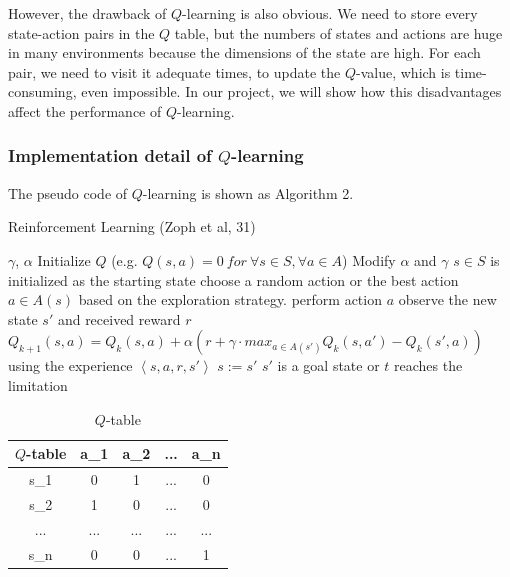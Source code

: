 \documentclass[14pt]{extarticle}
\begin{document}
However, the drawback of $Q$-learning is also obvious. We need to store every state-action pairs in the $Q$ table, but the numbers of states and actions are huge in many environments because the dimensions of the state are high. For each pair, we need to visit it adequate times, to update the $Q$-value, which is time-consuming, even impossible. In our project, we will show how this disadvantages affect the performance of $Q$-learning.

\subsubsection*{\small Implementation detail of $Q$-learning}

The pseudo code of $Q$-learning is shown as Algorithm 2.

\begin{algorithm}
    \caption{Reinforcement Learning (Zoph et al, 31) }\label{euclid}
    \begin{algorithmic}[1]
    \Require $\gamma$, $\alpha$
    \State Initialize $Q$ (e.g. $Q(s,a) = 0 \ for \ \forall s \in S, \forall a \in A$)
        \State Modify $\alpha$ and $\gamma$
        \State $s \in S$ is initialized as the starting state
        \Repeat
            \State choose a random action or the best action $a \in A(s)$ based on the exploration strategy.
            \State perform action $a$
            \State observe the new state $s'$ and received reward $r$
            \State \small $Q_{k+1}(s, a) = Q_{k}(s, a) + \alpha(r + \gamma \cdot max_{a \in A(s')}Q_k(s,a') - Q_k(s', a))$
            \State using the experience $\left\langle s,a,r,s'\right\rangle $
            \State $s := s'$
        \Until $s'$ is a goal state or $t$ reaches the limitation
    \EndFor
    \end{algorithmic}
\end{algorithm}


\begin{table}[]
    \begin{center}
        \begin{tabular}{|c|c|c|c|c|}
        \hline
        $Q$-table & a\_1 & a\_2 & ... & a\_n \\ \hline
        s\_1      & 0    & 1    & ... & 0    \\ \hline
        s\_2      & 1    & 0    & ... & 0    \\ \hline
        ...       & ...  & ...  & ... & ...  \\ \hline
        s\_n      & 0    & 0    & ... & 1    \\ \hline
        \end{tabular}
        \caption{$Q$-table}
    \end{center}
\end{table}    
\end{document}
